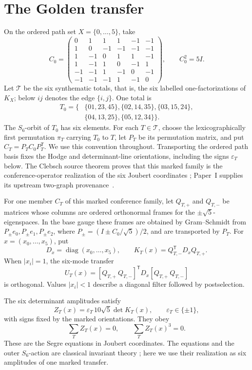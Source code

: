 \documentclass[11pt]{article}
\theoremstyle{remark}
\begin{document}
\section{The Golden transfer}

On the ordered path set \(X=\{0,\ldots,5\}\), take
\[
C_0=\begin{pmatrix}
0&1&1&1&-1&-1\\
1&0&-1&-1&-1&-1\\
1&-1&0&1&1&-1\\
1&-1&1&0&-1&1\\
-1&-1&1&-1&0&-1\\
-1&-1&-1&1&-1&0
\end{pmatrix},\qquad C_0^2=5I.
\]
Let \(\mathcal T\) be the six synthematic totals, that is, the six labelled
one-factorizations of \(K_X\); below \(ij\) denotes the edge \(\{i,j\}\).
One total is
\[
\begin{split}
T_0=\{&
\{01,23,45\},\{02,14,35\},\{03,15,24\},\\
&\{04,13,25\},\{05,12,34\}\}.
\end{split}
\]
The \(S_6\)-orbit of \(T_0\) has six elements.  For each
\(T\in\mathcal T\), choose the lexicographically first permutation
\(\pi_T\) carrying \(T_0\) to \(T\), let \(P_T\) be its permutation matrix,
and put \(C_T=P_TC_0P_T^{\mathsf T}\).  We use this convention throughout.
Transporting the ordered path basis fixes the Hodge and
determinant-line orientations, including the signs \(\varepsilon_T\) below.
The Clebsch source theorem proves that this marked family is the
conference-operator realization of the six Joubert coordinates
\cite[Theorem~5.1]{ClebschIII}; Paper~I supplies its upstream
two-graph provenance~\cite{ClebschI}.

For one member \(C_T\) of this marked conference family, let
\(Q_{T,+}\) and \(Q_{T,-}\) be matrices whose columns are ordered orthonormal
frames for the \(\pm\sqrt5\)-eigenspaces.  In the base gauge these frames are
obtained by Gram--Schmidt from
\(P_{\pm}e_0,P_{\pm}e_1,P_{\pm}e_2\), where
\(P_\pm=(I\pm C_0/\sqrt5)/2\), and are transported by \(P_T\).  For
\(x=(x_0,\ldots,x_5)\), put
\[
 D_x=\operatorname{diag}(x_0,\ldots,x_5),\qquad
 K_T(x)=Q_{T,-}^{\mathsf T}D_xQ_{T,+}.
\]
When \(|x_i|=1\), the six-mode transfer
\[
 U_T(x)=
 [Q_{T,+}\ Q_{T,-}]^{\mathsf T}D_x[Q_{T,+}\ Q_{T,-}]
\]
is orthogonal.  Values \(|x_i|<1\) describe a diagonal filter followed by
postselection.

The six determinant amplitudes satisfy
\begin{equation}
\label{eq:golden-amplitude}
 Z_T(x)=\varepsilon_T\,10\sqrt5\det K_T(x),
 \qquad \varepsilon_T\in\{\pm1\},
\end{equation}
with signs fixed by the marked orientations.  They obey
\begin{equation}
\label{eq:segre-nulls}
 \sum_T Z_T(x)=0,\qquad \sum_T Z_T(x)^3=0.
\end{equation}
These are the Segre equations in Joubert coordinates.  The equations and the
outer \(S_6\)-action are classical invariant theory
\cite{HowardMillsonSnowdenVakil}; here we use their realization as six
amplitudes of one marked transfer.
\end{document}
